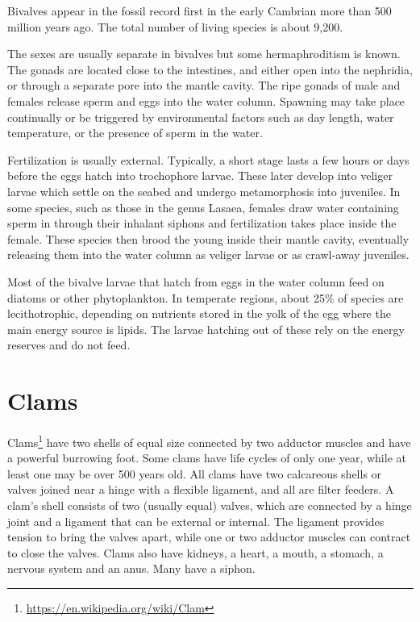 \documentclass[]{book}
\let\rmarkdownfootnote\footnote%
\def\footnote{\protect\rmarkdownfootnote}
\renewcommand{\href}[2]{#2\footnote{\url{#1}}}
\theoremstyle{definition}
\theoremstyle{definition}
\theoremstyle{definition}
\theoremstyle{remark}
\begin{document}
Bivalves appear in the fossil record first in the early Cambrian more
than 500 million years ago. The total number of living species is about
9,200.

The sexes are usually separate in bivalves but some hermaphroditism is
known. The gonads are located close to the intestines, and either open
into the nephridia, or through a separate pore into the mantle cavity.
The ripe gonads of male and females release sperm and eggs into the
water column. Spawning may take place continually or be triggered by
environmental factors such as day length, water temperature, or the
presence of sperm in the water.

Fertilization is usually external. Typically, a short stage lasts a few
hours or days before the eggs hatch into trochophore larvae. These later
develop into veliger larvae which settle on the seabed and undergo
metamorphosis into juveniles. In some species, such as those in the
genus Lasaea, females draw water containing sperm in through their
inhalant siphons and fertilization takes place inside the female. These
species then brood the young inside their mantle cavity, eventually
releasing them into the water column as veliger larvae or as crawl-away
juveniles.

Most of the bivalve larvae that hatch from eggs in the water column feed
on diatoms or other phytoplankton. In temperate regions, about 25\% of
species are lecithotrophic, depending on nutrients stored in the yolk of
the egg where the main energy source is lipids. The larvae hatching out
of these rely on the energy reserves and do not feed.

\section{Clams}\label{clams}

\href{https://en.wikipedia.org/wiki/Clam}{Clams} have two shells of
equal size connected by two adductor muscles and have a powerful
burrowing foot. Some clams have life cycles of only one year, while at
least one may be over 500 years old. All clams have two calcareous
shells or valves joined near a hinge with a flexible ligament, and all
are filter feeders. A clam's shell consists of two (usually equal)
valves, which are connected by a hinge joint and a ligament that can be
external or internal. The ligament provides tension to bring the valves
apart, while one or two adductor muscles can contract to close the
valves. Clams also have kidneys, a heart, a mouth, a stomach, a nervous
system and an anus. Many have a siphon.
\end{document}
